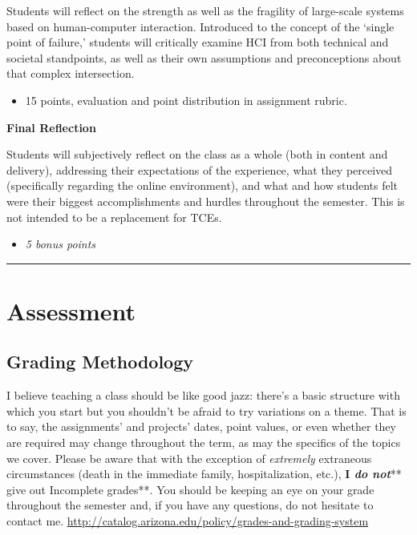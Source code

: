 \documentclass[]{article}
\providecommand{\tightlist}{%
  \setlength{\itemsep}{0pt}\setlength{\parskip}{0pt}}
\begin{document}
Students will reflect on the strength as well as the fragility of
large-scale systems based on human-computer interaction. Introduced to
the concept of the `single point of failure,' students will critically
examine HCI from both technical and societal standpoints, as well as
their own assumptions and preconceptions about that complex
intersection.

\begin{itemize}
\tightlist
\item
  15 points, evaluation and point distribution in assignment rubric.
\end{itemize}

\textbf{Final Reflection}

Students will subjectively reflect on the class as a whole (both in
content and delivery), addressing their expectations of the experience,
what they perceived (specifically regarding the online environment), and
what and how students felt were their biggest accomplishments and
hurdles throughout the semester. This is not intended to be a
replacement for TCEs.

\begin{itemize}
\tightlist
\item
  \emph{5 bonus points}
\end{itemize}

\begin{center}\rule{0.5\linewidth}{\linethickness}\end{center}

\hypertarget{assessment}{%
\section{Assessment}\label{assessment}}

\hypertarget{grading-methodology}{%
\subsection{Grading Methodology}\label{grading-methodology}}

I believe teaching a class should be like good jazz: there's a basic
structure with which you start but you shouldn't be afraid to try
variations on a theme. That is to say, the assignments' and projects'
dates, point values, or even whether they are required may change
throughout the term, as may the specifics of the topics we cover. Please
be aware that with the exception of \emph{extremely} extraneous
circumstances (death in the immediate family, hospitalization, etc.),
\textbf{I \emph{do not}}** give out Incomplete grades**. You should be
keeping an eye on your grade throughout the semester and, if you have
any questions, do not hesitate to contact me.
\url{http://catalog.arizona.edu/policy/grades-and-grading-system}
\end{document}
